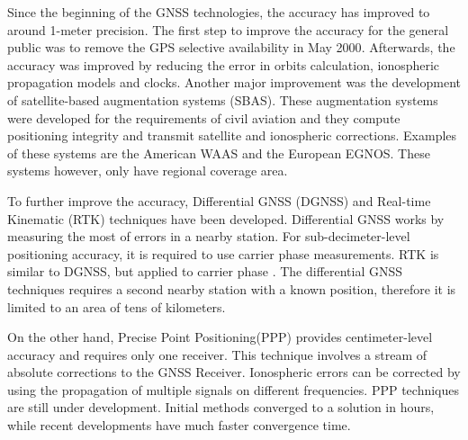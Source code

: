 Since the beginning of the GNSS technologies, the accuracy has improved to around 1-meter precision\cite{galileoHasPolicy}. The first step to improve the accuracy for the general public was to remove the GPS selective availability in May 2000\cite{galileoHasPolicy}. Afterwards, the accuracy was improved by reducing the error in orbits calculation, ionospheric propagation models and clocks\cite{galileoHasPolicy}. Another major improvement was the development of satellite-based augmentation systems (SBAS). These augmentation systems were developed for the requirements of civil aviation and they compute positioning integrity and transmit satellite and ionospheric corrections\cite{galileoHasPolicy}. Examples of these systems are the American WAAS and the European EGNOS. These systems however, only have regional coverage area.

To further improve the accuracy, Differential GNSS (DGNSS) and Real-time Kinematic (RTK) techniques have been developed. Differential GNSS works by measuring the most of errors in a nearby station\cite{galileoHasPolicy}. For sub-decimeter-level positioning accuracy, it is required to use carrier phase measurements. RTK is similar to DGNSS, but applied to carrier phase \cite{galileoHasPolicy}. The differential GNSS techniques requires a second nearby station with a known position, therefore it is limited to an area of tens of kilometers\cite{galileoHasPolicy}.

On the other hand, Precise Point Positioning(PPP) provides centimeter-level accuracy and requires only one receiver. This technique involves a stream of absolute corrections to the GNSS Receiver. Ionospheric errors can be corrected by using the propagation of multiple signals on different frequencies. PPP techniques are still under development. Initial methods converged to a solution in hours, while recent developments have much faster convergence time\cite{galileoHasPolicy}\cite{instantPPP}. 